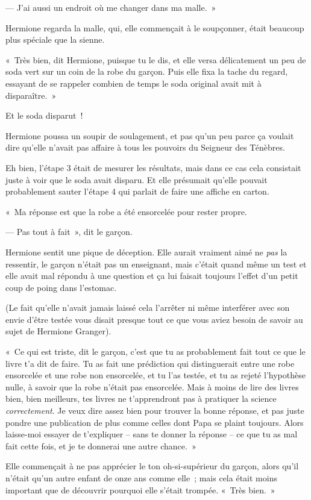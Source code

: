 --- J'ai aussi un endroit où me changer dans ma malle.~»

Hermione regarda la malle, qui, elle commençait à le soupçonner, était beaucoup plus spéciale que la sienne.

«~Très bien, dit Hermione, puisque tu le dis, et elle versa délicatement un peu de soda vert sur un coin de la robe du garçon. Puis elle fixa la tache du regard, essayant de se rappeler combien de temps le soda original avait mit à disparaître.~»

Et le soda disparut~!

Hermione poussa un soupir de soulagement, et pas qu'un peu parce ça voulait dire qu'elle n'avait pas affaire à tous les pouvoirs du Seigneur des Ténèbres.

Eh bien, l'étape 3 était de mesurer les résultats, mais dans ce cas cela consistait juste à voir que le soda avait disparu. Et elle présumait qu'elle pouvait probablement sauter l'étape 4 qui parlait de faire une affiche en carton.

«~Ma réponse est que la robe a été ensorcelée pour rester propre.

--- Pas tout à fait~», dit le garçon.

Hermione sentit une pique de déception. Elle aurait vraiment aimé ne \emph{pas} la ressentir, le garçon n'était pas un enseignant, mais c'était quand même un test et elle avait mal répondu à une question et ça lui faisait toujours l'effet d'un petit coup de poing dans l'estomac.

(Le fait qu'elle n'avait jamais laissé cela l'arrêter ni même interférer avec son envie d'être testée vous disait presque tout ce que vous aviez besoin de savoir au sujet de Hermione Granger).

«~Ce qui est triste, dit le garçon, c'est que tu as probablement fait tout ce que le livre t'a dit de faire. Tu as fait une prédiction qui distinguerait entre une robe ensorcelée et une robe non ensorcelée, et tu l'as testée, et tu as rejeté l'hypothèse nulle, à savoir que la robe n'était pas ensorcelée. Mais à moins de lire des livres bien, bien meilleurs, tes livres ne t'apprendront pas à pratiquer la science \emph{correctement}. Je veux dire assez bien pour trouver la bonne réponse, et pas juste pondre une publication de plus comme celles dont Papa se plaint toujours. Alors laisse-moi essayer de t'expliquer -- sans te donner la réponse -- ce que tu as mal fait cette fois, et je te donnerai une autre chance.~»

Elle commençait à ne pas apprécier le ton oh-si-supérieur du garçon, alors qu'il n'était qu'un autre enfant de onze ans comme elle~; mais cela était moins important que de découvrir pourquoi elle s'était trompée. «~Très bien.~»

